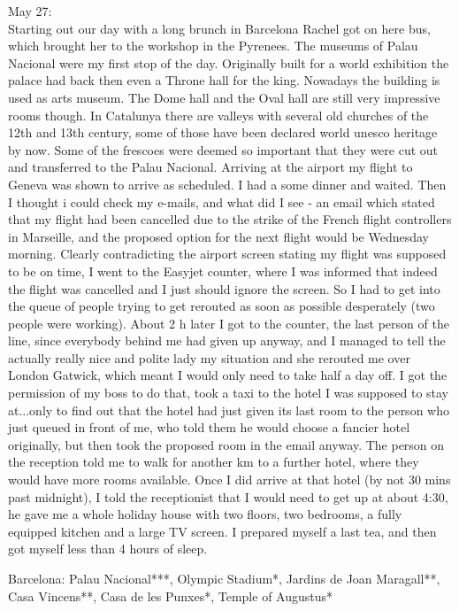 May 27:\\
Starting out our day with a long brunch in Barcelona Rachel got on here bus, which brought her to the workshop in the Pyrenees. The museums of Palau Nacional were my first stop of the day. Originally built for a world exhibition the palace had back then even a Throne hall for the king. Nowadays the building is used as arts museum. The Dome hall and the Oval hall are still very impressive rooms though. In Catalunya there are valleys with several old churches of the 12th and 13th century, some of those have been declared world unesco heritage by now. Some of the frescoes were deemed so important that they were cut out and transferred to the Palau Nacional.
Arriving at the airport my flight to Geneva was shown to arrive as scheduled. I had a some dinner and waited. Then I thought i could check my e-mails, and what did I see - an email which stated that my flight had been cancelled due to the strike of the French flight controllers in Marseille, and the proposed option for the next flight would be Wednesday morning. Clearly contradicting the airport screen stating my flight was supposed to be on time, I went to the Easyjet counter, where I was informed that indeed the flight was cancelled and I just should ignore the screen. So I had to get into the queue of people trying to get rerouted as soon as possible desperately (two people were working). About 2 h later I got to the counter, the last person of the line, since everybody behind me had given up anyway, and I managed to tell the actually really nice and polite lady my situation and she rerouted me over London Gatwick, which meant I would only need to take half a day off. I got the permission of my boss to do that, took a taxi to the hotel I was supposed to stay at...only to find out that the hotel had just given its last room to the person who just queued in front of me, who told them he would choose a fancier hotel originally, but then took the proposed room in the email anyway. The person on the reception told me to walk for another km to a further hotel, where they would have more rooms available. Once I did arrive at that hotel (by not 30 mins past midnight), I told the receptionist that I would need to get up at about 4:30, he gave me a whole holiday house with two floors, two bedrooms, a fully equipped kitchen and a large TV screen. I prepared myself a last tea, and then got myself less than 4 hours of sleep.

Barcelona: Palau Nacional***, Olympic Stadium*, Jardins de Joan Maragall**, Casa Vincens**, Casa de les Punxes*, Temple of Augustus*\\

